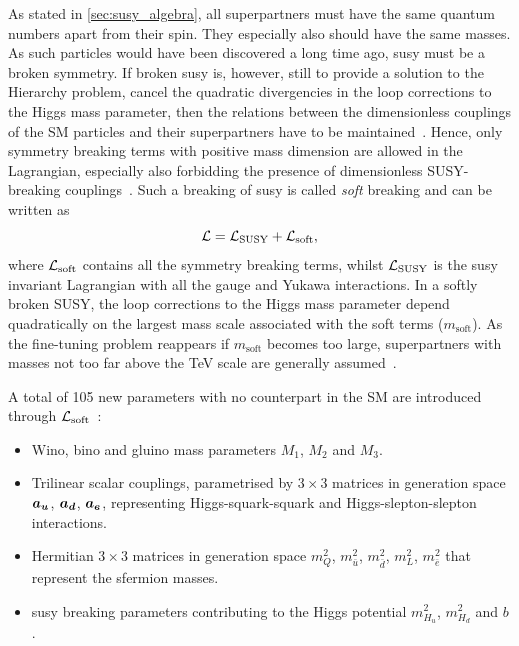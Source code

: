 As stated in \cref{sec:susy_algebra}, all superpartners must have the same quantum numbers apart from their spin. They especially also should have the same masses. As such particles would have been discovered a long time ago, \gls{susy} must be a broken symmetry. If broken \gls{susy} is, however, still to provide a solution to the Hierarchy problem, \ie cancel the quadratic divergencies in the loop corrections to the Higgs mass parameter, then the relations between the dimensionless couplings of the SM particles and their superpartners have to be maintained~\cite{Martin:1997ns}. Hence, only symmetry breaking terms with positive mass dimension are allowed in the Lagrangian, especially also forbidding the presence of dimensionless SUSY-breaking couplings~\cite{Martin:1997ns}. Such a breaking of \gls{susy} is called \textit{soft} breaking and can be written as
\begin{equation}
	\mathcal{L} = \mathcal{L}_\mathrm{SUSY} + \mathcal{L}_\mathrm{soft},
\end{equation}
where $\mathcal{L}_\mathrm{soft}$ contains all the symmetry breaking terms, whilst $\mathcal{L}_\mathrm{SUSY}$ is the \gls{susy} invariant Lagrangian with all the gauge and Yukawa interactions. In a softly broken SUSY, the loop corrections to the Higgs mass parameter depend quadratically on the largest mass scale associated with the soft terms ($m_\mathrm{soft}$). As the fine-tuning problem reappears if $m_\mathrm{soft}$ becomes too large, superpartners with masses not too far above the TeV scale are generally assumed~\cite{Martin:1997ns}.

A total of 105 new parameters with no counterpart in the SM are introduced through $\mathcal{L}_\mathrm{soft}$~\cite{Martin:1997ns,Dimopoulos:1995ju}:
\begin{itemize}
	\item Wino, bino and gluino mass parameters $M_1$, $M_2$ and $M_3$.
	\item Trilinear scalar couplings, parametrised by $3\times 3$ matrices in generation space $\makemebold{a_u}$, $\makemebold{a_d}$, $\makemebold{a_e}$, representing Higgs-squark-squark and Higgs-slepton-slepton interactions.
	\item Hermitian $3\times 3$ matrices in generation space \boldmath $m_Q^2$, $m^2_{\bar{u}}$, $m^2_{\bar{d}}$, $m^2_L$, $m^2_{\bar{e}}$ \unboldmath that represent the sfermion masses.
	\item \gls{susy} breaking parameters contributing to the Higgs potential $m^2_{H_u}$, $m^2_{H_d}$ and $b$.
\end{itemize}

